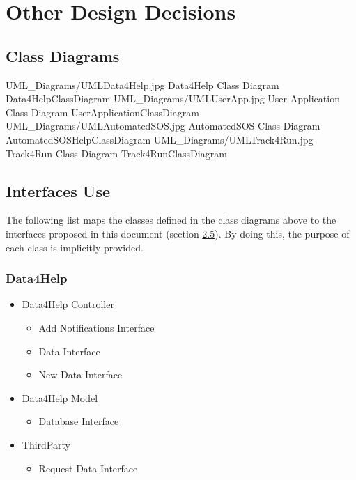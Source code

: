 \documentclass[../../DD.tex]{subfiles}
\begin{document}
\section{Other Design Decisions}
	\subsection{Class Diagrams}
	\image {13cm} {UML_Diagrams/UMLData4Help.jpg} {Data4Help Class Diagram} {Data4HelpClassDiagram}
	\image {13cm} {UML_Diagrams/UMLUserApp.jpg} {User Application Class Diagram} {UserApplicationClassDiagram}
	\image {13cm} {UML_Diagrams/UMLAutomatedSOS.jpg} {AutomatedSOS Class Diagram} {AutomatedSOSHelpClassDiagram}
	\image {13cm} {UML_Diagrams/UMLTrack4Run.jpg} {Track4Run Class Diagram} {Track4RunClassDiagram}

	\subsection{Interfaces Use}
		The following list maps the classes defined in the class diagrams above to the interfaces proposed in this document (section \hyperref[sect:2.5]{2.5}). By doing this, the purpose of each class is implicitly provided.
		\subsubsection{Data4Help}
		
		\begin{itemize}
			\item Data4Help Controller
			\begin{itemize}
				\item Add Notifications Interface
				\item Data Interface
				\item New Data Interface
			\end{itemize}
			\item Data4Help Model
			\begin{itemize}
				\item Database Interface
			\end{itemize}
			\item ThirdParty
			\begin{itemize}
				\item Request Data Interface
			\end{itemize}
		\end{itemize}
\end{document}
